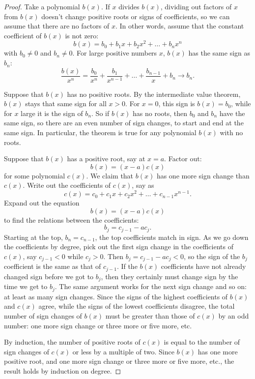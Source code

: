 \begin{proof}
Take a polynomial \(b(x)\).
If \(x\) divides \(b(x)\), dividing out factors of \(x\) from \(b(x)\) doesn't change positive roots or signs of coefficients, so we can assume that there are no factors of \(x\).
In other words, assume that the constant coefficient of \(b(x)\) is not zero:
\[
b(x)=b_0+b_1x+b_2x^2+\dots+b_n x^n
\] 
with \(b_0 \ne 0\) and \(b_n \ne 0\).
For large positive numbers \(x\), \(b(x)\) has the same sign as \(b_n\):
\[
\frac{b(x)}{x^n}
=
\frac{b_0}{x^n} + \frac{b_1}{x^{n-1}} + \dots + \frac{b_{n-1}}{x} + b_n \to b_n.
\]

Suppose that \(b(x)\) has no positive roots.
By the intermediate value theorem, \(b(x)\) stays that same sign for all \(x>0\).
For \(x=0\), this sign is \(b(x)=b_0\), while for \(x\) large it is the sign of \(b_n\).
So if \(b(x)\) has no roots, then \(b_0\) and \(b_n\) have the same sign, so there are an even number of sign changes, to start and end at the same sign.
In particular, the theorem is true for any polynomial \(b(x)\) with no roots.

Suppose that \(b(x)\) has a positive root, say at \(x=a\).
Factor out:
\[
b(x)=(x-a)c(x)
\]
for some polynomial \(c(x)\).
We claim that \(b(x)\) has one more sign change than \(c(x)\).
Write out the coefficients of \(c(x)\), say as
\[
c(x)=c_0+c_1x+c_2x^2+\dots+c_{n-1} x^{n-1}.
\]
Expand out the equation
\[
b(x)=(x-a)c(x)
\]
to find the relations between the coefficients:
\[
b_j = c_{j-1}-ac_j.
\]
Starting at the top, \(b_n=c_{n-1}\), the top coefficients match in sign.
As we go down the coefficients by degree, pick out the first sign change in the coefficients of \(c(x)\), say \(c_{j-1}<0\) while \(c_j>0\).
Then \(b_j=c_{j-1}-ac_j<0\), so the sign of the \(b_j\) coefficient is the same as that of \(c_{j-1}\).
If the \(b(x)\) coefficients have not already changed sign before we got to \(b_j\), then they certainly must change sign by the time we get to \(b_j\).
The same argument works for the next sign change and so on: at least as many sign changes.
Since the signs of the highest coefficients of \(b(x)\) and \(c(x)\) agree, while the signs of the lowest coefficients disagree, the total number of sign changes of \(b(x)\) must be greater than those of \(c(x)\) by an odd number: one more sign change or three more or five more, etc.

By induction, the number of positive roots of \(c(x)\) is equal to the number of sign changes of \(c(x)\) or less by a multiple of two.
Since \(b(x)\) has one more positive root, and one more sign change or three more or five more, etc., the result holds by induction on degree.
\end{proof}

